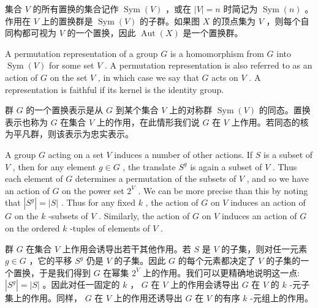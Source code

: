 \documentclass[10pt]{article}
\begin{document}
\begin{tcolorbox}\relax
集合 \(V\) 的所有置换的集合记作 \(\operatorname{Sym}\left( V\right)\) ，或在 \(\left| V\right|  = n\) 时简记为 \(\operatorname{Sym}\left( n\right)\) 。作用在 \(V\) 上的置换群是 \(\operatorname{Sym}\left( V\right)\) 的子群。如果图 \(X\) 的顶点集为 \(V\) ，则每个自同构都可视为 \(V\) 的一个置换，因此 \(\operatorname{Aut}\left( X\right)\) 是一个置换群。
\end{tcolorbox}

A permutation representation of a group \(G\) is a homomorphism from \(G\) into \(\operatorname{Sym}\left( V\right)\) for some set \(V\) . A permutation representation is also referred to as an action of \(G\) on the set \(V\) , in which case we say that \(G\) acts on \(V\) . A representation is faithful if its kernel is the identity group.

\begin{tcolorbox}\relax
群 \(G\) 的一个置换表示是从 \(G\) 到某个集合 \(V\) 上的对称群 \(\operatorname{Sym}\left( V\right)\) 的同态。置换表示也称为 \(G\) 在集合 \(V\) 上的作用，在此情形我们说 \(G\) 在 \(V\) 上作用。若同态的核为平凡群，则该表示为忠实表示。
\end{tcolorbox}

A group \(G\) acting on a set \(V\) induces a number of other actions. If \(S\) is a subset of \(V\) , then for any element \(g \in  G\) , the translate \({S}^{g}\) is again a subset of \(V\) . Thus each element of \(G\) determines a permutation of the subsets of \(V\) , and so we have an action of \(G\) on the power set \({2}^{V}\) . We can be more precise than this by noting that \(\left| {S}^{g}\right|  = \left| S\right|\) . Thus for any fixed \(k\) , the action of \(G\) on \(V\) induces an action of \(G\) on the \(k\) -subsets of \(V\) . Similarly, the action of \(G\) on \(V\) induces an action of \(G\) on the ordered \(k\) -tuples of elements of \(V\) .

\begin{tcolorbox}\relax
群 \(G\) 在集合 \(V\) 上作用会诱导出若干其他作用。若 \(S\) 是 \(V\) 的子集，则对任一元素 \(g \in  G\) ，它的平移 \({S}^{g}\) 仍是 \(V\) 的子集。因此 \(G\) 的每个元素都决定了 \(V\) 的子集的一个置换，于是我们得到 \(G\) 在幂集 \({2}^{V}\) 上的作用。我们可以更精确地说明这一点: \(\left| {S}^{g}\right|  = \left| S\right|\) 。因此对任一固定的 \(k\) ， \(G\) 在 \(V\) 上的作用会诱导出 \(G\) 在 \(V\) 的 \(k\) -元子集上的作用。同样， \(G\) 在 \(V\) 上的作用还诱导出 \(G\) 在 \(V\) 的有序 \(k\) -元组上的作用。
\end{tcolorbox}
\end{document}
